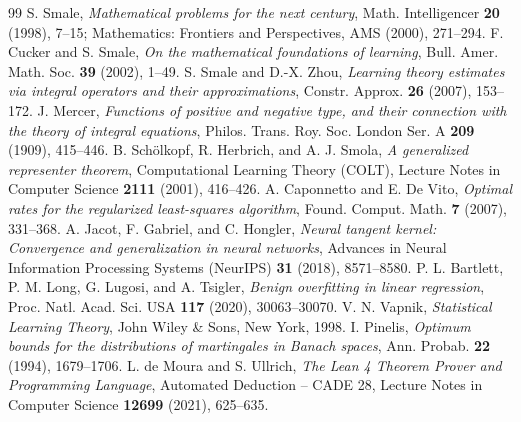 \documentclass[11pt,a4paper]{article}
\theoremstyle{definition}
\begin{document}
\begin{thebibliography}{99}
 S. Smale, \textit{Mathematical problems for the next century}, Math. Intelligencer \textbf{20} (1998), 7--15; Mathematics: Frontiers and Perspectives, AMS (2000), 271--294.
 F. Cucker and S. Smale, \textit{On the mathematical foundations of learning}, Bull. Amer. Math. Soc. \textbf{39} (2002), 1--49.
 S. Smale and D.-X. Zhou, \textit{Learning theory estimates via integral operators and their approximations}, Constr. Approx. \textbf{26} (2007), 153--172.
 J. Mercer, \textit{Functions of positive and negative type, and their connection with the theory of integral equations}, Philos. Trans. Roy. Soc. London Ser. A \textbf{209} (1909), 415--446.
 B. Sch\"olkopf, R. Herbrich, and A. J. Smola, \textit{A generalized representer theorem}, Computational Learning Theory (COLT), Lecture Notes in Computer Science \textbf{2111} (2001), 416--426.
 A. Caponnetto and E. De Vito, \textit{Optimal rates for the regularized least-squares algorithm}, Found. Comput. Math. \textbf{7} (2007), 331--368.
 A. Jacot, F. Gabriel, and C. Hongler, \textit{Neural tangent kernel: Convergence and generalization in neural networks}, Advances in Neural Information Processing Systems (NeurIPS) \textbf{31} (2018), 8571--8580.
 P. L. Bartlett, P. M. Long, G. Lugosi, and A. Tsigler, \textit{Benign overfitting in linear regression}, Proc. Natl. Acad. Sci. USA \textbf{117} (2020), 30063--30070.
 V. N. Vapnik, \textit{Statistical Learning Theory}, John Wiley \& Sons, New York, 1998.
 I. Pinelis, \textit{Optimum bounds for the distributions of martingales in Banach spaces}, Ann. Probab. \textbf{22} (1994), 1679--1706.
 L. de Moura and S. Ullrich, \textit{The Lean 4 Theorem Prover and Programming Language}, Automated Deduction -- CADE 28, Lecture Notes in Computer Science \textbf{12699} (2021), 625--635.
\end{thebibliography}
\end{document}

